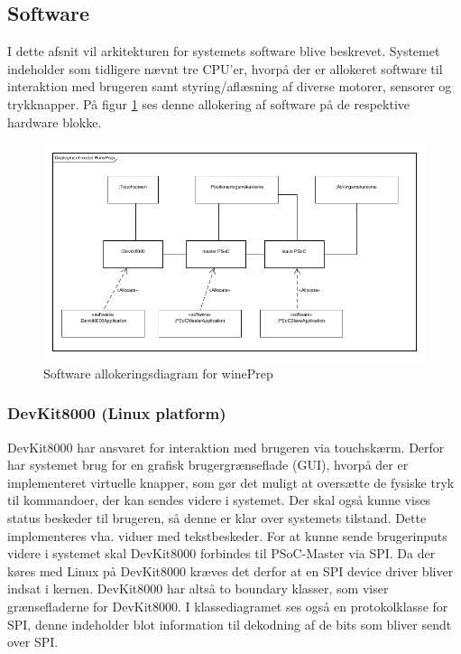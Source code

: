 \subsection{Software}
I dette afsnit vil arkitekturen for systemets software blive beskrevet.
Systemet indeholder som tidligere nævnt tre CPU'er, hvorpå der er allokeret software til interaktion med brugeren samt styring/aflæsning af diverse 
motorer, sensorer og trykknapper. På figur \ref{AlDi} ses denne allokering af software på de respektive hardware blokke. \\

\begin{figure}[H]
	\includegraphics[scale=0.4]{tex/Arkitektur/Fotos/SW/Allokeringsdiagram}
	\caption{Software allokeringsdiagram for winePrep}
	\label{AlDi}
\end{figure}  

\subsubsection{DevKit8000 (Linux platform)}
DevKit8000 har ansvaret for interaktion med brugeren via touchskærm. Derfor har systemet brug for en grafisk brugergrænseflade (GUI), hvorpå der er
implementeret virtuelle knapper, som gør det muligt at oversætte de fysiske tryk til kommandoer, der kan sendes videre i systemet. Der skal også kunne vises
status beskeder til brugeren, så denne er klar over systemets tilstand. Dette implementeres vha. viduer med tekstbeskeder. For at kunne sende brugerinputs 
videre i systemet skal DevKit8000 forbindes til PSoC-Master via SPI. Da der køres med Linux på DevKit8000 kræves det derfor at en SPI device driver bliver
indsat i kernen. DevKit8000 har altså to boundary klasser, som viser grænsefladerne for DevKit8000. I klassediagramet ses også en protokolklasse for SPI, denne 
indeholder blot information til dekodning af de bits som bliver sendt over SPI. \\

